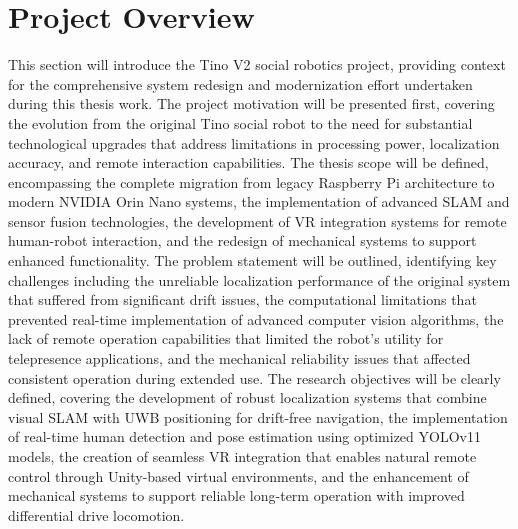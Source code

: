 \section{Project Overview}
This section will introduce the Tino V2 social robotics project, providing context for the comprehensive system redesign and modernization effort undertaken during this thesis work. The project motivation will be presented first, covering the evolution from the original Tino social robot to the need for substantial technological upgrades that address limitations in processing power, localization accuracy, and remote interaction capabilities. The thesis scope will be defined, encompassing the complete migration from legacy Raspberry Pi architecture to modern NVIDIA Orin Nano systems, the implementation of advanced SLAM and sensor fusion technologies, the development of VR integration systems for remote human-robot interaction, and the redesign of mechanical systems to support enhanced functionality. The problem statement will be outlined, identifying key challenges including the unreliable localization performance of the original system that suffered from significant drift issues, the computational limitations that prevented real-time implementation of advanced computer vision algorithms, the lack of remote operation capabilities that limited the robot's utility for telepresence applications, and the mechanical reliability issues that affected consistent operation during extended use. The research objectives will be clearly defined, covering the development of robust localization systems that combine visual SLAM with UWB positioning for drift-free navigation, the implementation of real-time human detection and pose estimation using optimized YOLOv11 models, the creation of seamless VR integration that enables natural remote control through Unity-based virtual environments, and the enhancement of mechanical systems to support reliable long-term operation with improved differential drive locomotion.

